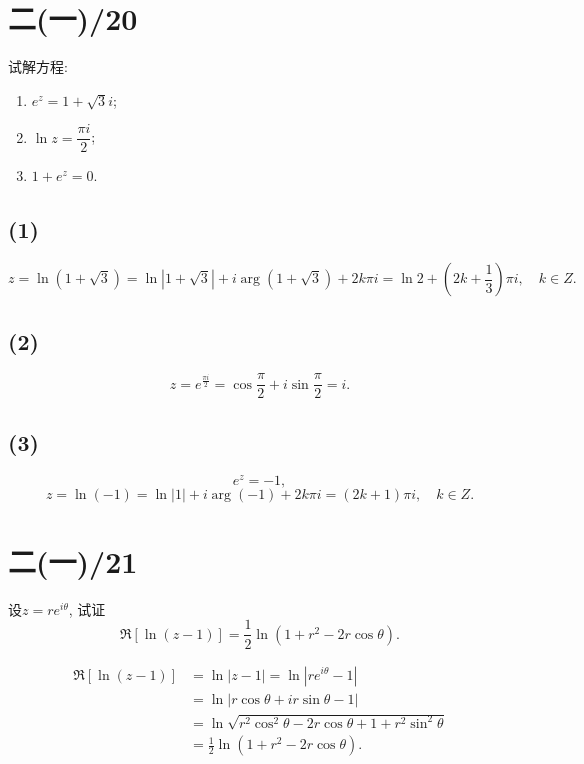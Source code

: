 \documentclass[11pt,a4paper]{article}
\begin{document}
\section{二(一)/20}
\begin{problem}
试解方程:
\begin{enumerate}
  \item $e^z=1+\sqrt{3}i$;
  \item $\ln z=\dfrac{\pi i}{2}$;
  \item $1+e^z=0$.
\end{enumerate}
\end{problem}

\subsection*{(1)}
$$z=\ln(1+\sqrt{3})=\ln|1+\sqrt{3}|+i\arg(1+\sqrt{3})+2k\pi i=\ln 2+\left(2k+\frac{1}{3}\right)\pi i,\quad k\in Z.$$

\subsection*{(2)}
$$z=e^{\frac{\pi i}{2}}=\cos\frac{\pi}{2}+i\sin\frac{\pi}{2}=i.$$

\subsection*{(3)}
$$e^z=-1,$$
$$z=\ln(-1)=\ln|1|+i\arg(-1)+2k\pi i=(2k+1)\pi i,\quad k\in Z.$$

\section{二(一)/21}
\begin{problem}
设$z=re^{i\theta}$, 试证
$$\Re[\ln(z-1)]=\frac{1}{2}\ln(1+r^2-2r\cos\theta).$$
\end{problem}
\begin{align*}
  \Re[\ln(z-1)] & =\ln|z-1|=\ln|re^{i\theta}-1|                             \\
                & =\ln|r\cos\theta+ir\sin\theta-1|                          \\
                & =\ln\sqrt{r^2\cos^2\theta-2r\cos\theta+1+r^2\sin^2\theta} \\
                & =\frac{1}{2}\ln(1+r^2-2r\cos\theta).
\end{align*}
\end{document}

